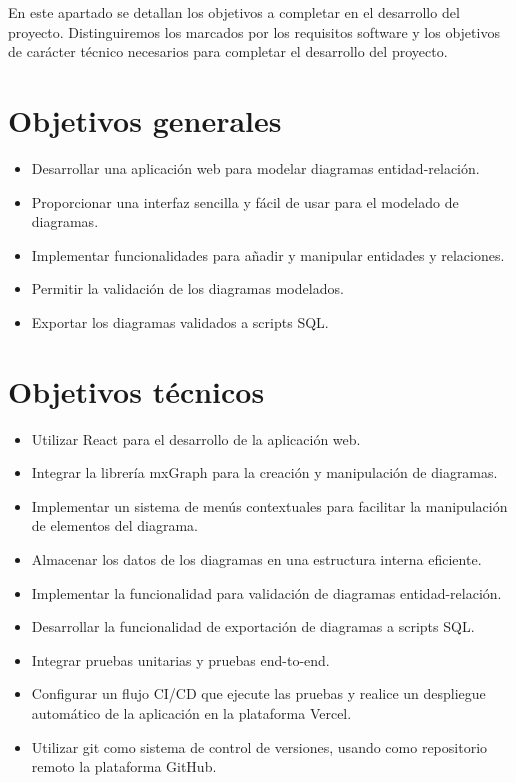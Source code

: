 
En este apartado se detallan los objetivos a completar en el desarrollo del proyecto. Distinguiremos los marcados por los requisitos software y los objetivos de carácter técnico necesarios para completar el desarrollo del proyecto.

\section{Objetivos generales}
\begin{itemize}
\tightlist
    \item Desarrollar una aplicación web para modelar diagramas entidad-relación.
    \item Proporcionar una interfaz sencilla y fácil de usar para el modelado de diagramas.
    \item Implementar funcionalidades para añadir y manipular entidades y relaciones.
    \item Permitir la validación de los diagramas modelados.
    \item Exportar los diagramas validados a scripts SQL.
\end{itemize}


\section{Objetivos técnicos}
\begin{itemize}
\tightlist
    \item Utilizar React para el desarrollo de la aplicación web.
    \item Integrar la librería mxGraph para la creación y manipulación de diagramas.
    \item Implementar un sistema de menús contextuales para facilitar la manipulación de elementos del diagrama.
    \item Almacenar los datos de los diagramas en una estructura interna eficiente.
    \item Implementar la funcionalidad para validación de diagramas entidad-relación.
    \item Desarrollar la funcionalidad de exportación de diagramas a scripts SQL.
    \item Integrar pruebas unitarias y pruebas end-to-end.
    \item Configurar un flujo CI/CD que ejecute las pruebas y realice un despliegue automático de la aplicación en la plataforma Vercel.
    \item Utilizar git como sistema de control de versiones, usando como repositorio remoto la plataforma GitHub.
\end{itemize}